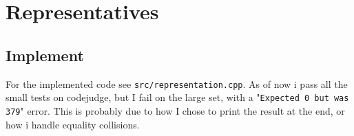 	\section{Representatives}
	
	\subsection{Implement}
	For the implemented code see \texttt{src/representation.cpp}. As of now i pass all the small tests on codejudge, but I fail on the large set, with a "\texttt{Expected 0 but was 379}" error. 
	This is probably due to how I chose to print the result at the end, or how i handle equality collisions.